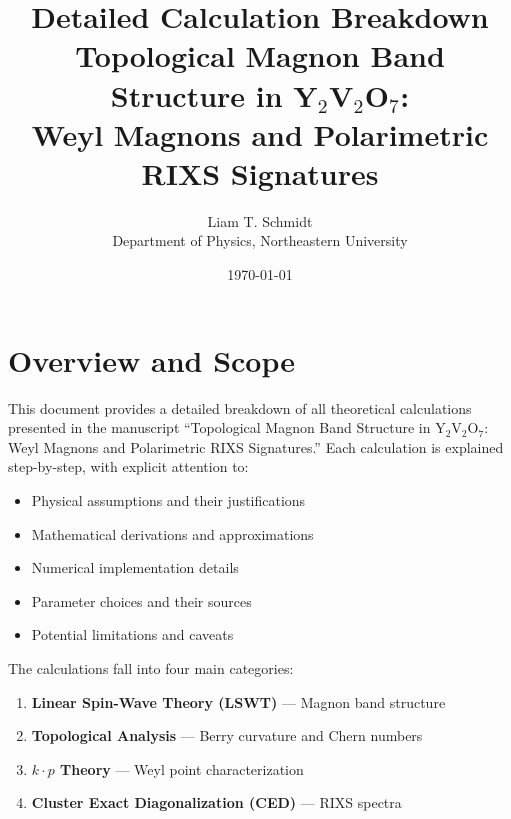 \documentclass[11pt,letterpaper]{article}
\begin{document}
\title{\textbf{Detailed Calculation Breakdown}\\[0.5em]
\Large Topological Magnon Band Structure in Y$_2$V$_2$O$_7$:\\
Weyl Magnons and Polarimetric RIXS Signatures}

\author{Liam T. Schmidt\\
\small Department of Physics, Northeastern University}

\date{\today}

\maketitle

\tableofcontents
\newpage

\section{Overview and Scope}

This document provides a detailed breakdown of all theoretical calculations presented in the manuscript ``Topological Magnon Band Structure in Y$_2$V$_2$O$_7$: Weyl Magnons and Polarimetric RIXS Signatures.'' Each calculation is explained step-by-step, with explicit attention to:

\begin{itemize}
    \item Physical assumptions and their justifications
    \item Mathematical derivations and approximations
    \item Numerical implementation details
    \item Parameter choices and their sources
    \item Potential limitations and caveats
\end{itemize}

The calculations fall into four main categories:
\begin{enumerate}
    \item \textbf{Linear Spin-Wave Theory (LSWT)} --- Magnon band structure
    \item \textbf{Topological Analysis} --- Berry curvature and Chern numbers
    \item \textbf{$k \cdot p$ Theory} --- Weyl point characterization
    \item \textbf{Cluster Exact Diagonalization (CED)} --- RIXS spectra
\end{enumerate}
\end{document}
